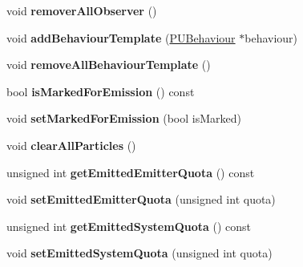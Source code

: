 \begin{DoxyCompactItemize}
\item 
\mbox{\label{classPUParticleSystem3D_a0d56d54d543d6b4969b9f0017ce0ecbe}} 
void {\bfseries remover\+All\+Observer} ()
\item 
\mbox{\label{classPUParticleSystem3D_a090d2d771bf87a7ea4cd28728c183018}} 
void {\bfseries add\+Behaviour\+Template} (\hyperlink{classPUBehaviour}{P\+U\+Behaviour} $\ast$behaviour)
\item 
\mbox{\label{classPUParticleSystem3D_ad2265c6d11cb97200536c50e0e1439c7}} 
void {\bfseries remove\+All\+Behaviour\+Template} ()
\item 
\mbox{\label{classPUParticleSystem3D_aacefdc56340a474eba3fb574f0450213}} 
bool {\bfseries is\+Marked\+For\+Emission} () const
\item 
\mbox{\label{classPUParticleSystem3D_a0c58271109897c6960d1da7b8352b957}} 
void {\bfseries set\+Marked\+For\+Emission} (bool is\+Marked)
\item 
\mbox{\label{classPUParticleSystem3D_af624e8deb5f00cda34df04b15b6c8db6}} 
void {\bfseries clear\+All\+Particles} ()
\item 
\mbox{\label{classPUParticleSystem3D_a8a52d90c8ba2d92aad7890b156e4bb0c}} 
unsigned int {\bfseries get\+Emitted\+Emitter\+Quota} () const
\item 
\mbox{\label{classPUParticleSystem3D_a48c8c01e2e7f1d9a01dc76cac2a64dcb}} 
void {\bfseries set\+Emitted\+Emitter\+Quota} (unsigned int quota)
\item 
\mbox{\label{classPUParticleSystem3D_a782a5d0d9b6ce367916f485232b5c443}} 
unsigned int {\bfseries get\+Emitted\+System\+Quota} () const
\item 
\mbox{\label{classPUParticleSystem3D_a3fbccda2071b4959f98ceeafd6335ae0}} 
void {\bfseries set\+Emitted\+System\+Quota} (unsigned int quota)
\item 
\mbox{\label{classPUParticleSystem3D_a4171daecac61ea4099dc922f6b7a50d6}} 

\end{DoxyCompactItemize}
